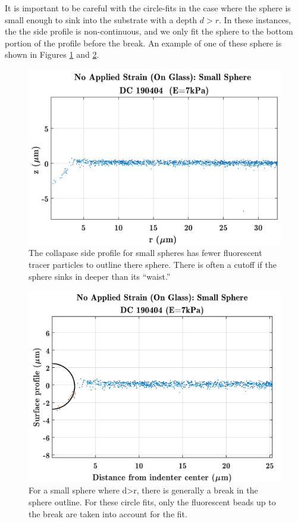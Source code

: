 It is important to be careful with the circle-fits in the case where the sphere is small enough to sink into the substrate with a depth $ d > r $. In these instances, the the side profile is non-continuous, and we only fit the sphere to the bottom portion of the profile before the break. An example of one of these sphere is shown in Figures \ref{fig:smallsphere017190404dcglass} and \ref{fig:smallsphere017ciclefitspheredc}.
\begin{figure}[h!]
	\centering
	\includegraphics[width=\linewidth]{Chapters/Figures/smallsphere017_190404_DC_glass}
	\caption[Small Sphere Side Profile]{The collapase side profile for small spheres has fewer fluorescent tracer particles to outline there sphere. There is often a cutoff if the sphere sinks in deeper than its ``waist.''}
	\label{fig:smallsphere017190404dcglass}
\end{figure}
\begin{figure}[h!]
	\centering
	\includegraphics[width=\linewidth]{Chapters/Figures/smallsphere017_cicle_fitsphere_DC}
	\caption[Small Sphere Circle Fit]{For a small sphere where d>r, there is generally a break in the sphere outline. For these circle fits, only the fluorescent beads up to the break are taken into account for the fit.}
	\label{fig:smallsphere017ciclefitspheredc}
\end{figure}




